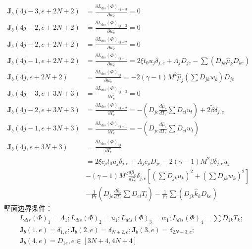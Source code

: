 \begin{equation*}\label{}
  \begin{aligned}\label{}
    \mathbf{J}_b(4j - 3,e + 2N + 2) &= \frac{{\partial L_{dis} \left( \Phi  \right)_{4j - 3} }}{{\partial w_e }} = 0\\
    \mathbf{J}_b(4j - 2,e + 2N + 2) &= \frac{{\partial L_{dis} \left( \Phi  \right)_{4j - 2} }}{{\partial w_e }} = 0\\
    \mathbf{J}_b(4j - 2,e + 2N + 2) &= \frac{{\partial L_{dis} \left( \Phi  \right)_{4j - 2} }}{{\partial w_e }} = 0\\
    \mathbf{J}_b(4j - 1,e + 2N + 2) &= \frac{{\partial L_{dis} \left( \Phi  \right)_{4j - 1} }}{{\partial w_e }} = 2\xi t_0 u_j \delta _{j,e}  + \Lambda_j D_{je}  - \sum {\left( {D_{jk} \hat \mu _k D_{ke} } \right)}\\
    \mathbf{J}_b(4j,e + 2N + 2) &= \frac{{\partial L_{dis} \left( \Phi  \right)_{4j} }}{{\partial w_e }} =  - 2(\gamma  - 1)M^2 \hat \mu _j \left( {\sum {D_{jk} w_k } } \right)D_{je}\\
    \mathbf{J}_b(4j - 3,e + 3N + 3) &= \frac{{\partial L_{dis} \left( \Phi  \right)_{4j - 3} }}{{\partial T_e }} = 0\\
    \mathbf{J}_b(4j - 2,e + 3N + 3) &= \frac{{\partial L_{dis} \left( \Phi  \right)_{4j - 2} }}{{\partial T_e }} =  - \left( {D_{je} \frac{{d\hat \mu _e }}{{dT_e }}\sum {D_{el} u_l } } \right) + 2\tilde \beta \delta _{j,e}\\
    \mathbf{J}_b(4j - 1,e + 3N + 3) &= \frac{{\partial L_{dis} \left( \Phi  \right)_{4j - 1} }}{{\partial T_e }} =  - \left( {D_{je} \frac{{d\hat \mu _e }}{{dT_e }}\sum {D_{el} w_l } } \right)\\
    \mathbf{J}_b(4j,e + 3N + 3) &= \frac{{\partial L_{dis} \left( \Phi  \right)_{4j} }}{{\partial T_e }} \\ &= 2\xi c_p t_0 u_j \delta _{j,e}  + \Lambda_j c_p D_{je}  - 2(\gamma  - 1)M^2 \tilde \beta \delta _{j,e} u_j \\ & -(\gamma  - 1)M^2 \frac{{d\hat \mu _e }}{{dT_e }}\delta _{j,e} \left[ {\left( {\sum {D_{jk} u_k } } \right)^2  + \left( {\sum {D_{jk} w_k } } \right)^2 } \right] \\ & - \frac{1}{{\Pr }}\left( {D_{je} \frac{{d\hat k_e }}{{dT_e }}\sum {D_{el} T_l } } \right)  - \frac{1}{{\Pr }}\sum {\left( {D_{jk} \hat k_k D_{ke} } \right)}
  \end{aligned}
\end{equation*}
壁面边界条件：
\begin{equation*}\label{}
  \begin{aligned}\label{}
    &L_{dis} \left( \Phi  \right)_1  = \Lambda_1 ;L_{dis} \left( \Phi  \right)_2  = u_1 ;L_{dis} \left( \Phi  \right)_3  = w_1 ;L_{dis} \left( \Phi  \right)_4  = \sum {D_{1k} T_k } ;\\
    &\mathbf{J}_b(1,e) = \delta _{1,e} ;\mathbf{J}_b(2,e) = \delta _{N + 2,e} ;\mathbf{J}_b(3,e) = \delta _{2N + 3,e} ;\\
    & \mathbf{J}_b(4,e) = D_{1e} ,e \in \left[ {3N + 4,4N + 4} \right]
  \end{aligned}
\end{equation*}
